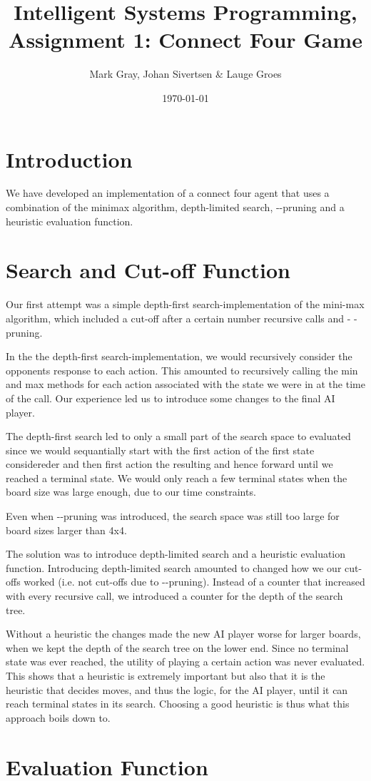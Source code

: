 \documentclass[11pt, a4paper]{article}
\author{Mark Gray, Johan Sivertsen \& Lauge Groes}
\title{Intelligent Systems Programming, Assignment 1: Connect Four Game}
\date{\today}
\begin{document}
\maketitle
\newpage
\section*{Introduction}


We have developed an implementation of a connect four agent that uses a
combination of the minimax algorithm, depth-limited search,
\alpha-\beta-pruning and a heuristic evaluation function.

\section*{Search and Cut-off Function}
Our first attempt was a simple depth-first search-implementation of the
mini-max algorithm, which included a cut-off after a certain number recursive
calls and \alpha - \beta-pruning. 

In the the depth-first search-implementation, we would recursively consider the
opponents response to each action. This amounted to recursively calling the min
and max methods for each action associated with the state we were in at the time
of the call. Our experience led us to introduce some changes to the final AI
player.

The depth-first search led to only a small part of the search space to
evaluated since we would sequantially start with the first action of the first
state considereder and then first action the resulting and hence forward until
we reached a terminal state. We would only reach a few terminal states when the
board size was large enough, due to our time constraints.

Even when \alpha-\beta-pruning was introduced, the search space was still too
large for board sizes larger than 4x4. 

The solution was to introduce depth-limited search and a heuristic evaluation
function. Introducing depth-limited search amounted to changed how we our
cut-offs worked (i.e. not cut-offs due to \alpha-\beta-pruning). Instead of a
counter that increased with every recursive call, we introduced a counter for
the depth of the search tree.

Without a heuristic the changes made the new AI player worse for larger boards,
when we kept the depth of the search tree on the lower end. Since no terminal
state was ever reached, the utility of playing a certain action was never
evaluated. This shows that a heuristic is extremely important but also that it
is the heuristic that decides moves, and thus the logic, for the AI player,
until it can reach terminal states in its search. Choosing a good heuristic is
thus what this approach boils down to.

\section*{Evaluation Function}
\end{document}
